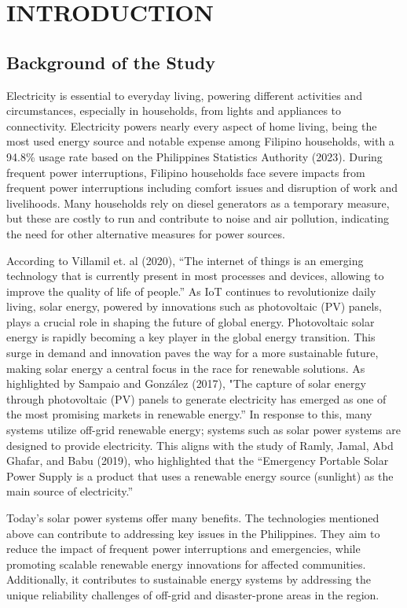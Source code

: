 \chapter{INTRODUCTION}

{\baselineskip


\section{Background of the Study}

Electricity is essential to everyday living, powering different activities and circumstances, especially in households, from lights and appliances to connectivity.  Electricity powers nearly every aspect of home living, being the most used energy source and notable expense among Filipino households, with a 94.8\% usage rate based on the Philippines Statistics Authority (2023). During frequent power interruptions, Filipino households face severe impacts from frequent power interruptions including comfort issues and disruption of work and livelihoods.  Many households rely on diesel generators as a temporary measure, but these are costly to run and contribute to noise and air pollution, indicating the need for other alternative measures for power sources.

According to Villamil et. al (2020), “The internet of things is an emerging technology that is currently present in most processes and devices, allowing to improve the quality of life of people.” As IoT continues to revolutionize daily living, solar energy, powered by innovations such as photovoltaic (PV) panels, plays a crucial role in shaping the future of global energy. Photovoltaic solar energy is rapidly becoming a key player in the global energy transition. This surge in demand and innovation paves the way for a more sustainable future, making solar energy a central focus in the race for renewable solutions. As highlighted by Sampaio and González (2017), "The capture of solar energy through photovoltaic (PV) panels to generate electricity has emerged as one of the most promising markets in renewable energy.”  In response to this, many systems utilize off-grid renewable energy; systems such as solar power systems are designed to provide electricity. This aligns with the study of Ramly, Jamal, Abd Ghafar, and Babu (2019), who highlighted that the “Emergency Portable Solar Power Supply is a product that uses a renewable energy source (sunlight) as the main source of electricity.”

Today's solar power systems offer many benefits. The technologies mentioned above can contribute to addressing key issues in the Philippines. They aim to reduce the impact of frequent power interruptions and emergencies, while promoting scalable renewable energy innovations for affected communities. Additionally, it contributes to sustainable energy systems by addressing the unique reliability challenges of off-grid and disaster-prone areas in the region.

}
